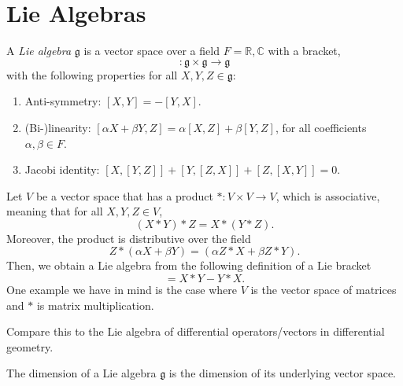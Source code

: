 \chapter{Lie Algebras}%
\label{cha:lie_algebras}

\begin{definition}
  A \emph{Lie algebra} $\mathfrak{g}$ is a vector space over a field $F = \mathbb{R}, \mathbb{C}$ with a bracket, 
  \begin{equation}
    [, ]: \mathfrak{g} \times \mathfrak{g} \to \mathfrak{g}
  \end{equation}
  with the following properties for all $X, Y, Z \in \mathfrak{g}$:
  \begin{enumerate}
    \item Anti-symmetry: $[X, Y] = -[Y, X]$.
    \item (Bi-)linearity: $[\alpha X + \beta Y, Z] = \alpha[X, Z] + \beta [Y, Z]$, for all coefficients $\alpha, \beta \in F$.
    \item Jacobi identity: $[X, [Y, Z] ] + [Y, [Z, X] ] + [Z, [X, Y] ] = 0$.
  \end{enumerate}
\end{definition}

Let $V$ be a vector space that has a product $*: V \times V \to V$, which is associative, meaning that for all $X, Y, Z \in V$,
\begin{equation}
  (X * Y) * Z = X*(Y*Z).
\end{equation}
Moreover, the product is distributive over the field
\begin{equation}
  Z * (\alpha X + \beta Y) = (\alpha Z*X + \beta Z*Y).
\end{equation}
Then, we obtain a Lie algebra from the following definition of a Lie bracket
\begin{equation}
  [X, Y] = X*Y - Y*X.
\end{equation}
One example we have in mind is the case where $V$ is the vector space of matrices and $*$ is matrix multiplication. 
\begin{leftbar}
  \begin{remark}
    Compare this to the Lie algebra of differential operators/vectors in differential geometry.
  \end{remark}
\end{leftbar}

\begin{definition}[dimension]
  The dimension of a Lie algebra $\mathfrak{g}$ is the dimension of its underlying vector space.
\end{definition}

